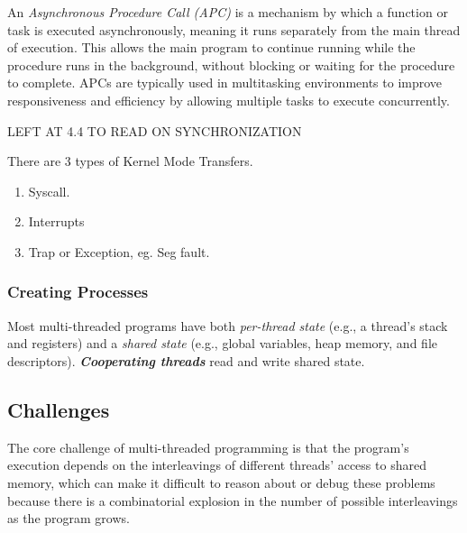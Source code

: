 \documentclass{article}
\begin{document}
\begin{definition}
    An \textit{Asynchronous Procedure Call (APC)} is a mechanism by which a function or task is executed asynchronously, meaning it runs separately from the main thread of execution. This allows the main program to continue running while the procedure runs in the background, without blocking or waiting for the procedure to complete. APCs are typically used in multitasking environments to improve responsiveness and efficiency by allowing multiple tasks to execute concurrently.
\end{definition}

{\color{red} LEFT AT 4.4 TO READ ON SYNCHRONIZATION}



\newpage
{}
There are 3 types of Kernel Mode Transfers.

\begin{enumerate}
    \item Syscall.
    \item Interrupts
    \item Trap or Exception, eg. Seg fault.
\end{enumerate}

\subsubsection{Creating Processes}

\newpage


Most multi-threaded programs have both \textit{per-thread state} (e.g., a thread's stack and registers) and a \textit{shared state} (e.g., global variables, heap memory, and file descriptors). \textbf{\textit{Cooperating threads}} read and write shared state.

\subsection{Challenges}
The core challenge of multi-threaded programming is that the program's execution depends on the interleavings of different threads' access to shared memory, which can make it difficult to reason about or debug these problems because there is a combinatorial explosion in the number of possible interleavings as the program grows.
\end{document}
